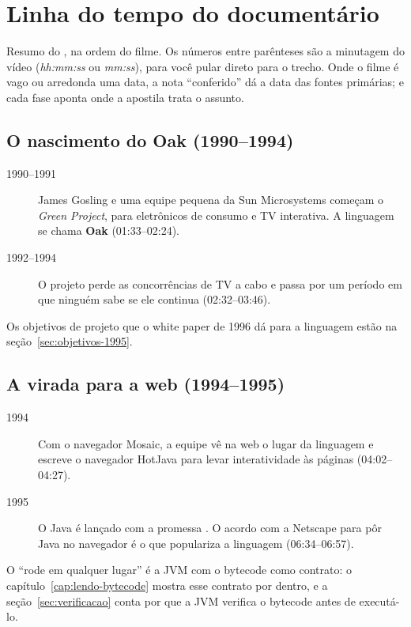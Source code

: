 \section{Linha do tempo do documentário}
\label{sec:linha-do-tempo}

Resumo do , na ordem do filme. Os números entre
parênteses são a minutagem do vídeo (\emph{hh:mm:ss} ou \emph{mm:ss}), para
você pular direto para o trecho. Onde o filme é vago ou arredonda uma data,
a nota \enquote{conferido} dá a data das fontes primárias; e cada fase
aponta onde a apostila trata o assunto.

\subsection{O nascimento do Oak (1990--1994)}
\begin{description}
\item[1990--1991] James Gosling e uma equipe pequena da Sun Microsystems
  começam o \emph{Green Project}, para eletrônicos de consumo e TV
  interativa. A linguagem se chama \textbf{Oak} (01:33--02:24).
\item[1992--1994] O projeto perde as concorrências de TV a cabo e passa
  por um período em que ninguém sabe se ele continua (02:32--03:46).
\end{description}
Os objetivos de projeto que o white paper de 1996 dá para a linguagem
estão na seção~\ref{sec:objetivos-1995}.

\subsection{A virada para a web (1994--1995)}
\begin{description}
\item[1994] Com o navegador Mosaic, a equipe vê na web o lugar da
  linguagem e escreve o navegador HotJava para levar interatividade às
  páginas (04:02--04:27).
\item[1995] O Java é lançado com a promessa . O acordo
  com a Netscape para pôr Java no navegador é o que populariza a linguagem
  (06:34--06:57).
\end{description}
O \enquote{rode em qualquer lugar} é a JVM com o bytecode como contrato:
o capítulo~\ref{cap:lendo-bytecode} mostra esse contrato por dentro, e
a seção~\ref{sec:verificacao} conta por que a JVM verifica o bytecode
antes de executá-lo.

